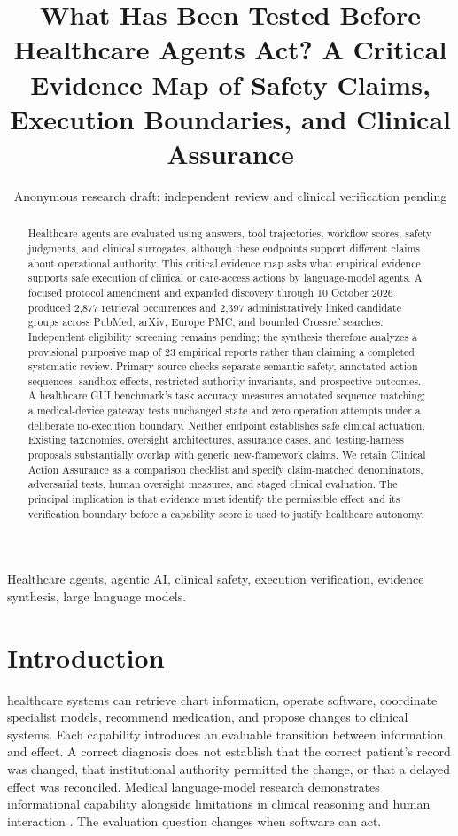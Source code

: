 \documentclass[journal,10pt]{IEEEtran}
\title{What Has Been Tested Before Healthcare Agents Act? A Critical Evidence Map of Safety Claims, Execution Boundaries, and Clinical Assurance}
\author{Anonymous research draft: independent review and clinical verification pending}
\begin{document}
\maketitle\raggedbottom{}
\begin{abstract}
Healthcare agents are evaluated using answers, tool trajectories, workflow scores, safety judgments, and clinical surrogates, although these endpoints support different claims about operational authority. This critical evidence map asks what empirical evidence supports safe execution of clinical or care-access actions by language-model agents. A focused protocol amendment and expanded discovery through 10 October 2026 produced 2,877 retrieval occurrences and 2,397 administratively linked candidate groups across PubMed, arXiv, Europe PMC, and bounded Crossref searches. Independent eligibility screening remains pending; the synthesis therefore analyzes a provisional purposive map of 23 empirical reports rather than claiming a completed systematic review. Primary-source checks separate semantic safety, annotated action sequences, sandbox effects, restricted authority invariants, and prospective outcomes. A healthcare GUI benchmark's task accuracy measures annotated sequence matching; a medical-device gateway tests unchanged state and zero operation attempts under a deliberate no-execution boundary. Neither endpoint establishes safe clinical actuation. Existing taxonomies, oversight architectures, assurance cases, and testing-harness proposals substantially overlap with generic new-framework claims. We retain Clinical Action Assurance as a comparison checklist and specify claim-matched denominators, adversarial tests, human oversight measures, and staged clinical evaluation. The principal implication is that evidence must identify the permissible effect and its verification boundary before a capability score is used to justify healthcare autonomy.
\end{abstract}
\begin{IEEEkeywords}Healthcare agents, agentic AI, clinical safety, execution verification, evidence synthesis, large language models.\end{IEEEkeywords}
\section{Introduction}
 healthcare systems can retrieve chart information, operate software, coordinate specialist models, recommend medication, and propose changes to clinical systems. Each capability introduces an evaluable transition between information and effect. A correct diagnosis does not establish that the correct patient's record was changed, that institutional authority permitted the change, or that a delayed effect was reconciled. Medical language-model research demonstrates informational capability alongside limitations in clinical reasoning and human interaction \cite{singhal2023,moor2023,hager2024,goh2024}. The evaluation question changes when software can act.
\end{document}

